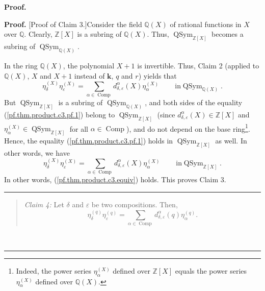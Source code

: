 \documentclass[numbers=enddot,12pt,final,onecolumn,notitlepage]{scrartcl}%
\theoremstyle{definition}
\newenvironment{statement}{\begin{quote}}{\end{quote}}
\newenvironment{proof}[1][Proof]{\noindent\textbf{#1.} }{\ \rule{0.5em}{0.5em}}
\let\sumnonlimits\sum
\renewcommand{\sum}{\sumnonlimits\limits}
\begin{document}
\begin{proof}
\begin{statement}
\end{statement}

\begin{proof}
[Proof of Claim 3.]Consider the field $\mathbb{Q}\left(  X\right)  $ of
rational functions in $X$ over $\mathbb{Q}$. Clearly, $\mathbb{Z}\left[
X\right]  $ is a subring of $\mathbb{Q}\left(  X\right)  $. Thus,
$\operatorname*{QSym}\nolimits_{\mathbb{Z}\left[  X\right]  }$ becomes a
subring of $\operatorname*{QSym}\nolimits_{\mathbb{Q}\left(  X\right)  }$.

In the ring $\mathbb{Q}\left(  X\right)  $, the polynomial $X+1$ is
invertible. Thus, Claim 2 (applied to $\mathbb{Q}\left(  X\right)  $, $X$ and
$X+1$ instead of $\mathbf{k}$, $q$ and $r$) yields that%
\begin{equation}
\eta_{\delta}^{\left(  X\right)  }\eta_{\varepsilon}^{\left(  X\right)  }%
=\sum_{\alpha\in\operatorname*{Comp}}d_{\delta,\varepsilon}^{\alpha}\left(
X\right)  \eta_{\alpha}^{\left(  X\right)  }\ \ \ \ \ \ \ \ \ \ \text{in
}\operatorname*{QSym}\nolimits_{\mathbb{Q}\left(  X\right)  }.
\label{pf.thm.product.c3.pf.1}%
\end{equation}
But $\operatorname*{QSym}\nolimits_{\mathbb{Z}\left[  X\right]  }$ is a
subring of $\operatorname*{QSym}\nolimits_{\mathbb{Q}\left(  X\right)  }$, and
both sides of the equality (\ref{pf.thm.product.c3.pf.1}) belong to
$\operatorname*{QSym}\nolimits_{\mathbb{Z}\left[  X\right]  }$ (since
$d_{\delta,\varepsilon}^{\alpha}\left(  X\right)  \in\mathbb{Z}\left[
X\right]  $ and $\eta_{\alpha}^{\left(  X\right)  }\in\operatorname*{QSym}%
\nolimits_{\mathbb{Z}\left[  X\right]  }$ for all $\alpha\in
\operatorname*{Comp}$), and do not depend on the base ring\footnote{Indeed,
the power series $\eta_{\alpha}^{\left(  X\right)  }$ defined over
$\mathbb{Z}\left[  X\right]  $ equals the power series $\eta_{\alpha}^{\left(
X\right)  }$ defined over $\mathbb{Q}\left(  X\right)  $.}. Hence, the
equality (\ref{pf.thm.product.c3.pf.1}) holds in $\operatorname*{QSym}%
\nolimits_{\mathbb{Z}\left[  X\right]  }$ as well. In other words, we have
\[
\eta_{\delta}^{\left(  X\right)  }\eta_{\varepsilon}^{\left(  X\right)  }%
=\sum_{\alpha\in\operatorname*{Comp}}d_{\delta,\varepsilon}^{\alpha}\left(
X\right)  \eta_{\alpha}^{\left(  X\right)  }\ \ \ \ \ \ \ \ \ \ \text{in
}\operatorname*{QSym}\nolimits_{\mathbb{Z}\left[  X\right]  }.
\]
In other words, (\ref{pf.thm.product.c3.equiv}) holds. This proves Claim 3.
\end{proof}

\begin{statement}
\textit{Claim 4:} Let $\delta$ and $\varepsilon$ be two compositions. Then,%
\[
\eta_{\delta}^{\left(  q\right)  }\eta_{\varepsilon}^{\left(  q\right)  }%
=\sum_{\alpha\in\operatorname*{Comp}}d_{\delta,\varepsilon}^{\alpha}\left(
q\right)  \eta_{\alpha}^{\left(  q\right)  }.
\]


\end{statement}
\end{proof}
\end{document}

